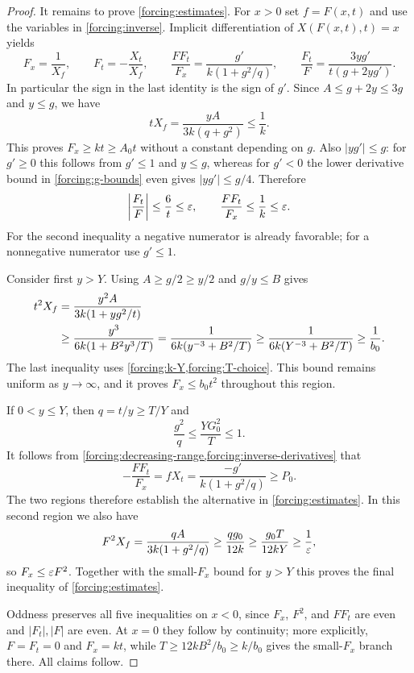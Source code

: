 \begin{proof}
It remains to prove \cref{forcing:estimates}.  For $x>0$ set
$f=F(x,t)$ and use the variables in \cref{forcing:inverse}.  Implicit
differentiation of $X(F(x,t),t)=x$ yields
\begin{equation}\label{forcing:signed-identities}
 F_x=\frac1{X_f},\qquad F_t=-\frac{X_t}{X_f},\qquad
 \frac{FF_t}{F_x}=\frac{g'}{k(1+g^2/q)},\qquad
 \frac{F_t}{F}=\frac{3yg'}{t(g+2yg')}.
\end{equation}
In particular the sign in the last identity is the sign of $g'$.
Since $A\le g+2y\le3g$ and $y\le g$, we have
\begin{equation}\label{forcing:lower-slope}
 tX_f=\frac{yA}{3k(q+g^2)}\le\frac1k.
\end{equation}
This proves $F_x\ge kt\ge A_0t$ without a constant depending on $g$.
Also $|yg'|\le g$: for $g'\ge0$ this follows from $g'\le1$ and
$y\le g$, whereas for $g'<0$ the lower derivative bound in
\cref{forcing:g-bounds} even gives $|yg'|\le g/4$.  Therefore
\[
 \left|\frac{F_t}{F}\right|\le\frac6t\le\varepsilon,
 \qquad
 \frac{FF_t}{F_x}\le\frac1k\le\varepsilon.
\]
For the second inequality a negative numerator is already favorable;
for a nonnegative numerator use $g'\le1$.

Consider first $y>Y$.  Using $A\ge g/2\ge y/2$ and $g/y\le B$ gives
\begin{align}
 t^2X_f
 &=\frac{y^2A}{3k(1+yg^2/t)}\notag\\
 &\ge\frac{y^3}{6k(1+B^2y^3/T)}
  =\frac1{6k(y^{-3}+B^2/T)}
  \ge\frac1{6k(Y^{-3}+B^2/T)}
  \ge\frac1{b_0}.
 \label{forcing:large-y}
\end{align}
The last inequality uses \cref{forcing:k-Y,forcing:T-choice}.
This bound remains uniform as $y\to\infty$, and it proves
$F_x\le b_0t^2$ throughout this region.

If $0<y\le Y$, then $q=t/y\ge T/Y$ and
\[
 \frac{g^2}{q}\le\frac{YG_0^2}{T}\le1.
\]
It follows from \cref{forcing:decreasing-range,forcing:inverse-derivatives}
that
\begin{equation}\label{forcing:favorable-branch}
 -\frac{FF_t}{F_x}=fX_t
   =\frac{-g'}{k(1+g^2/q)}\ge P_0.
\end{equation}
The two regions therefore establish the alternative in
\cref{forcing:estimates}.  In this second region we also have
\begin{equation}\label{forcing:quadratic-upper}
 F^2X_f=\frac{qA}{3k(1+g^2/q)}
   \ge\frac{qg_0}{12k}
   \ge\frac{g_0T}{12kY}\ge\frac1{\varepsilon},
\end{equation}
so $F_x\le\varepsilon F^2$.  Together with the small-$F_x$ bound for $y>Y$
this proves the final inequality of \cref{forcing:estimates}.

Oddness preserves all five inequalities on $x<0$, since $F_x$, $F^2$,
and $FF_t$ are even and $|F_t|,|F|$ are even.  At $x=0$ they follow
by continuity; more explicitly, $F=F_t=0$ and $F_x=kt$, while
$T\ge12kB^2/b_0\ge k/b_0$ gives the small-$F_x$ branch there.
All claims follow.
\end{proof}


